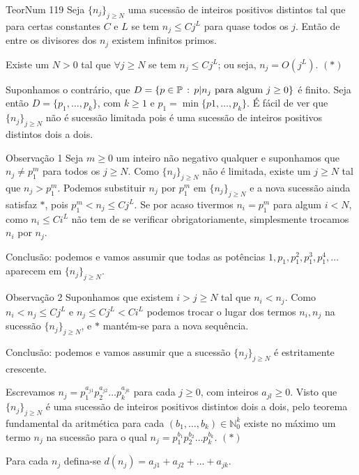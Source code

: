 \documentclass[repertorio-solutions-1.tex]{subfiles}
\newcommand*{\nj}{\ensuremath{\{n_j\}_{j\geq N}}}
\renewcommand*{\=}[1]{\ensuremath{\stackrel{\text{#1}}{=}}}
\begin{document}
\begin{problem}{TeorNum 119}
Seja $\nj$ uma sucessão de inteiros positivos distintos tal que
para certas constantes $C$ e $L$ se tem $n_j\leq Cj^L$ para quase todos os $j$.
Então de entre os divisores dos $n_j$ existem infinitos primos.
\end{problem}

\begin{solution}
Existe um $N>0$ tal que $\forall j\geq N$ se tem $n_j\leq Cj^L$; ou seja,
$n_j=O(j^L)$. $(*)$

Suponhamos o contrário, que
$D=\{p\in\mathbb{P}\,:\, p|n_j\text{ para algum }j\geq 0\}$ é finito.
Seja então $D=\{p_1,\dots,p_k\}$, com $k\geq 1$ e $p_1=\min\{p1,\dots,p_k\}$.
É fácil de ver que $\nj$ não é sucessão limitada pois é uma
sucessão de inteiros positivos distintos dois a dois.

\begin{observation}{Observação 1}
Seja $m\geq 0$ um inteiro não negativo qualquer e suponhamos que $n_j\neq p_1^m$
para todos os $j\geq N$.
Como $\nj$ não é limitada, existe um $j\geq N$ tal que $n_j>p_1^m$.
Podemos substituir $n_j$ por $p_1^m$ em $\nj$ e a nova sucessão ainda satisfaz
$*$, pois $p_1^m<n_j\leq Cj^L$.
Se por acaso tivermos $n_i=p_1^m$ para algum $i<N$, como $n_i\leq Ci^L$
não tem de se verificar obrigatoriamente, simplesmente trocamos $n_i$ por $n_j$.

Conclusão: podemos e vamos assumir que todas as potências
$1,p_1,p_1^2,p_1^3,p_1^4,\dots$ aparecem em $\nj$.
\end{observation}

\begin{observation}{Observação 2}
Suponhamos que existem $i>j\geq N$ tal que $n_i<n_j$.
Como $n_i<n_j\leq Cj^L$ e $n_j\leq Cj^L<Ci^L$ podemos trocar o lugar dos termos
$n_i, n_j$ na sucessão $\nj$, e $*$ mantém-se para a nova sequência.

Conclusão: podemos e vamos assumir que a sucessão $\nj$ é estritamente crescente.
\end{observation}

Escrevamos $n_j=p_1^{a_{j1}}p_2^{a_{j2}}\dots p_k^{a_{jk}}$ para cada $j\geq 0$,
com inteiros $a_{jl}\geq 0$.
Visto que $\nj$ é uma sucessão de inteiros positivos distintos dois a dois,
pelo teorema fundamental da aritmética para cada
$(b_1,\dots,b_k)\in\mathbb{N}_0^k$ existe no máximo um termo $n_j$ na sucessão
para o qual $n_j=p_1^{b_1}p_2^{b_2}\dots p_k^{b_k}$. $(*)$

Para cada $n_j$ defina-se $d(n_j)=a_{j1}+a_{j2}+\dots+a_{jk}$.


\end{solution}
\end{document}
